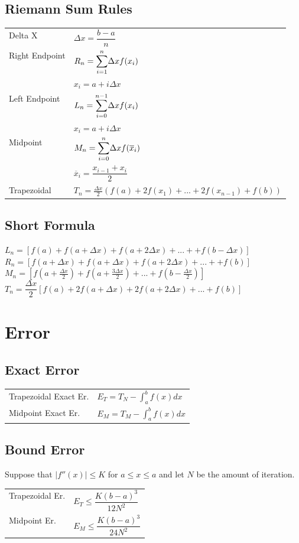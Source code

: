 \documentclass[5pt]{article}
\begin{document}
\begin{multicols}{2}
\subsection{Riemann Sum Rules}
\begin{tabular}{ll }
    Delta X & $\Delta x=\dfrac{b-a}{n}$\\
    Right Endpoint & $R_n=\mathlarger{\sum_{i=1}^n}\Delta xf(x_i)$\\
     & $x_i=a+i\Delta x$\\
    Left Endpoint & $L_n=\mathlarger{\sum_{i=0}^{n-1 }}\Delta xf(x_i)$\\
     & $x_i=a+i\Delta x$\\
    Midpoint & $M_n=\mathlarger{\sum_{i=0}^n}\Delta xf(\overline{x}_i)$\\
     & $\overline{x}_i=\dfrac{x_{i-1}+x_i}{2}$\\
    Trapezoidal & $T_n=\frac{\Delta x}{2}(f(a)+2f(x_1)+...+2f(x_{n-1})+f(b))$
\end{tabular}
\subsection{Short Formula}
$L_n=[f(a)+f(a+\Delta x)+f(a+2\Delta x)+...++f(b-\Delta x)]$\\
$R_n=[f(a+\Delta x)+f(a+\Delta x)+f(a+2\Delta x)+...++f(b)]$\\
$M_n=[f(a+\frac{\Delta x}{2})+f(a+\frac{3\Delta x}{2})+...+f(b-\frac{\Delta x}{2})]$\\
$T_n=\dfrac{\Delta x}{2}[f(a)+2f(a+\Delta x)+2f(a+2\Delta x)+...+f(b)]$

\section{Error}
\subsection{Exact Error}
\begin{tabular}{ll}
     Trapezoidal Exact Er. & $E_T=T_N-\int_a^bf(x)dx$\\
     Midpoint Exact Er. & $E_M=T_M-\int_a^bf(x)dx$\\
\end{tabular}

\subsection{Bound Error}
Suppose that $|f''(x)|\le K$ for $a\le x\le a$ and let $N$ be the amount of iteration.\\
\begin{tabular}{ll}
Trapezoidal Er. & $E_T\le\dfrac{K(b-a)^3}{12N^2}$\\
Midpoint Er. & $E_M\le\dfrac{K(b-a)^3}{24N^2}$\\
\end{tabular}

\end{multicols}
\end{document}

